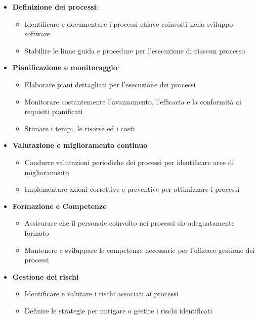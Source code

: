 \begin{itemize}
    \item \textbf{Definizione dei processi}:
        \begin{itemize}
            \item Identificare e documentare i processi chiave coinvolti nello sviluppo software
            \item Stabilire le linne guida e procedure per l'esecuzione di ciascun processo
        \end{itemize}
    \item \textbf{Pianificazione e monitoraggio}:
        \begin{itemize}
            \item Elaborare piani dettagliati per l'esecuzione dei processi
            \item Monitorare costantemente l'avanzamento, l'efficacia e la conformità ai requisiti pianificati
            \item Stimare i tempi, le risorse ed i costi
        \end{itemize}
    \item \textbf{Valutazione e miglioramento continuo}
        \begin{itemize}
            \item Condurre valutazioni periodiche dei processi per identificare aree di miglioramento
            \item Implementare azioni correttive e preventive per ottimizzare i processi
        \end{itemize}
    \item \textbf{Formazione e Competenze}
        \begin{itemize}
            \item Assicurare che il personale coinvolto nei processi sia adeguatamente formato
            \item Mantenere e sviluppare le competenze necessarie per l'efficace gestione dei processi
        \end{itemize}
    \item \textbf{Gestione dei rischi}
        \begin{itemize}
            \item Identificare e valutare i rischi associati ai processi
            \item Definire le strategie per mitigare o gestire i rischi identificati
        \end{itemize}
\end{itemize}
